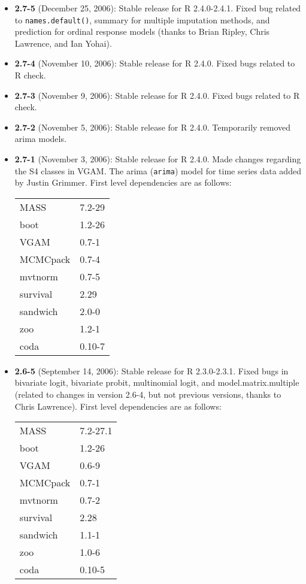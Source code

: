\begin{itemize}
\item {\bf 2.7-5} (December 25, 2006):  Stable release for R 2.4.0-2.4.1.  
Fixed bug related to {\tt names.default()}, summary for multiple 
imputation methods, and prediction for ordinal response models (thanks to 
Brian Ripley, Chris Lawrence, and Ian Yohai).  

\item {\bf 2.7-4} (November 10, 2006):  Stable release for R 2.4.0.  Fixed
bugs related to R check.

\item {\bf 2.7-3} (November 9, 2006):  Stable release for R 2.4.0.  Fixed 
bugs related to R check.  

\item {\bf 2.7-2} (November 5, 2006):  Stable release for R 2.4.0.  
Temporarily removed {\sc arima} models.  
  
\item {\bf 2.7-1} (November 3, 2006): Stable release for R 2.4.0. Made
  changes regarding the S4 classes in VGAM. The {\sc arima} ({\tt arima})
  model for time series data added by Justin Grimmer.  First level
  dependencies are as follows:\newline
\begin{tabular}{ll}
     MASS      &     7.2-29 \\
     boot      &    1.2-26 \\
     VGAM      &    0.7-1 \\
     MCMCpack  &    0.7-4 \\
     mvtnorm   &    0.7-5 \\
     survival  &    2.29 \\
     sandwich  &    2.0-0 \\
     zoo       &    1.2-1 \\
     coda      &    0.10-7 \\
\end{tabular} 


\item {\bf 2.6-5} (September 14, 2006): Stable release for R 2.3.0-2.3.1.  Fixed bugs
  in bivariate logit, bivariate probit, multinomial logit, and
  model.matrix.multiple (related to changes in version 2.6-4, but not
  previous versions, thanks to Chris Lawrence).  First level 
  dependencies are as follows:\newline
\begin{tabular}{ll}
     MASS      &     7.2-27.1 \\
     boot      &    1.2-26 \\
     VGAM      &    0.6-9 \\
     MCMCpack  &    0.7-1 \\
     mvtnorm   &    0.7-2 \\
     survival  &    2.28 \\
     sandwich  &    1.1-1 \\
     zoo       &    1.0-6 \\
     coda      &    0.10-5 \\
\end{tabular} 


\end{itemize}
